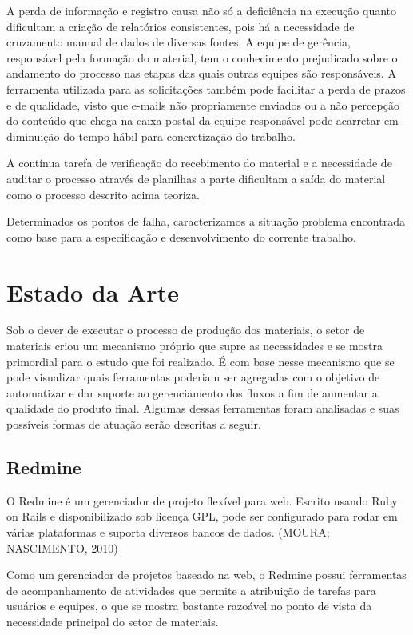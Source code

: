A perda de informação e registro causa não só a deficiência na execução quanto dificultam a criação de relatórios consistentes, pois há a necessidade de cruzamento manual de dados de diversas fontes. A equipe de gerência, responsável pela formação do material, tem o conhecimento prejudicado sobre o andamento do processo nas etapas das quais outras equipes são responsáveis. A ferramenta utilizada para as solicitações também pode facilitar a perda de prazos e de qualidade, visto que e-mails não propriamente enviados ou a não percepção do conteúdo que chega na caixa postal da equipe responsável pode acarretar em diminuição do tempo hábil para concretização do trabalho.

A contínua tarefa de verificação do recebimento do material e a necessidade de auditar o processo através de planilhas a parte dificultam a saída do material como o processo descrito acima teoriza. 

Determinados os pontos de falha, caracterizamos a situação problema encontrada como base para a especificação e desenvolvimento do corrente trabalho.

\section{Estado da Arte}

Sob o dever de executar o processo de produção dos materiais, o setor de materiais criou um mecanismo próprio que supre as necessidades e se mostra primordial para o estudo que foi realizado. É com base nesse mecanismo que se pode visualizar quais ferramentas poderiam ser agregadas com o objetivo de automatizar e dar suporte ao gerenciamento dos fluxos a fim de aumentar a qualidade do produto final. Algumas dessas ferramentas foram analisadas e suas possíveis formas de atuação serão descritas a seguir.

\subsection{Redmine}

O Redmine é um gerenciador de projeto flexível para web. Escrito usando Ruby on Rails e disponibilizado sob licença GPL, pode ser configurado para rodar em várias plataformas e suporta diversos bancos de dados. (MOURA; NASCIMENTO, 2010)

Como um gerenciador de projetos baseado na web, o Redmine possui ferramentas de acompanhamento de atividades que permite a atribuição de tarefas para usuários e equipes, o que se mostra bastante razoável no ponto de vista da necessidade principal do setor de materiais. 

